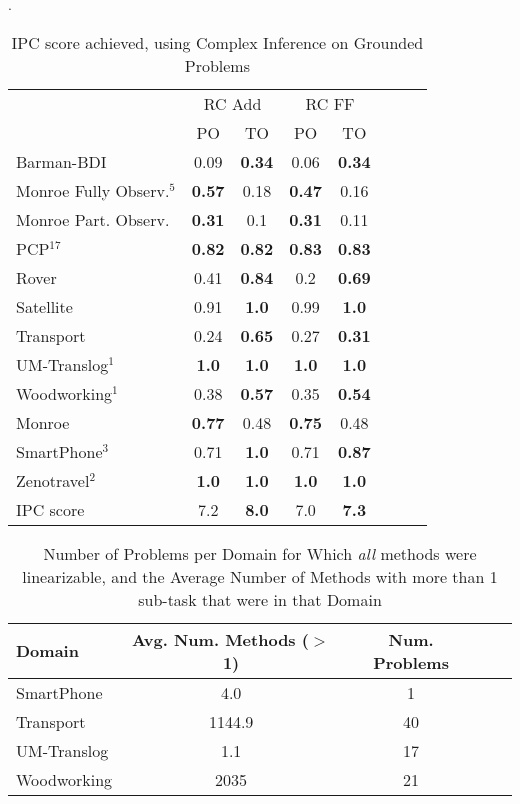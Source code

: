 \documentclass[letterpaper]{article} %
\begin{document}
\begin{table}
	\centering
	\caption{IPC score achieved, using Complex Inference on Grounded Problems}
	\label{table:GroundedComplexIPC}.
	\scalebox{0.8} { 
\begin{tabular}{lccccccl} 
			\toprule 
		& \multicolumn{2}{c}{ RC Add} & \multicolumn{2}{c}{ RC FF} \\ %
		\cmidrule(lr){2-3} \cmidrule(lr){4-5}  
	&PO & TO  &PO & TO  \\ 
	\midrule 
	Barman-BDI & 0.09 & \textbf{0.34} & 0.06 & \textbf{0.34}  \\ 

	Monroe Fully Observ.$^{5}$ & \textbf{0.57} & 0.18 & \textbf{0.47} & 0.16  \\ 
	Monroe Part. Observ. & \textbf{0.31} & 0.1 & \textbf{0.31} & 0.11  \\ 
	PCP$^{17}$ & \textbf{0.82} & \textbf{0.82} & \textbf{0.83} & \textbf{0.83}  \\ 
	Rover & 0.41 & \textbf{0.84} & 0.2 & \textbf{0.69}  \\ 
	Satellite & 0.91 & \textbf{1.0} & 0.99 & \textbf{1.0}  \\ 
	Transport & 0.24 & \textbf{0.65} & 0.27 & \textbf{0.31}  \\ 
	UM-Translog$^{1}$ & \textbf{1.0} & \textbf{1.0} & \textbf{1.0} & \textbf{1.0}  \\ 
	Woodworking$^{1}$ & 0.38 & \textbf{0.57} & 0.35 & \textbf{0.54}  \\ 
	\midrule 
	Monroe & \textbf{0.77} & 0.48 & \textbf{0.75} & 0.48  \\ 
	SmartPhone$^{3}$ & 0.71 & \textbf{1.0} & 0.71 & \textbf{0.87}  \\ 
	Zenotravel$^{2}$ & \textbf{1.0} & \textbf{1.0} & \textbf{1.0} & \textbf{1.0}  \\ 
		\midrule 
	IPC score & 7.2 & \textbf{8.0} & 7.0 & \textbf{7.3}  \\ 
	\bottomrule 
\end{tabular}  
	}
\end{table}


\begin{table} 
	\centering  
	\caption{Number of Problems per Domain for Which \emph{all} methods were linearizable, and the Average Number of Methods with more than 1 sub-task that were in that Domain}
	\label{table:FullyLinearizedProblems}
	\scalebox{0.75} { 
	\begin{tabular}{lcccl} 
		\toprule
		Domain      & Avg. Num. Methods ($>$ 1) & Num. Problems \\
		\midrule
		SmartPhone  & 4.0                   &  1     \\
		Transport   & 1144.9                & 40       \\
		UM-Translog & 1.1                    & 17   \\
		Woodworking & 2035              &   21    \\
				\bottomrule 
	\end{tabular} 
	}
\end{table}
\end{document}
